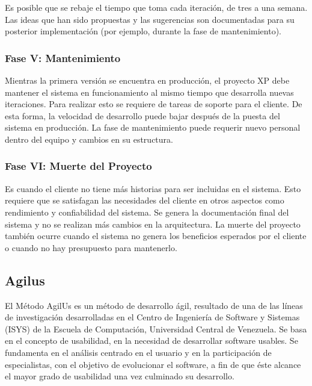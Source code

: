 	Es posible que se rebaje el tiempo que toma cada iteración, de tres a una semana. Las ideas que han sido propuestas y las sugerencias son documentadas para su posterior implementación (por ejemplo, durante la fase de mantenimiento).

\setlength{\parskip}{0mm}

\subsubsection{Fase V: Mantenimiento}
\setlength{\parskip}{5mm}

	Mientras la primera versión se encuentra en producción, el proyecto XP debe mantener el sistema en funcionamiento al mismo tiempo que desarrolla nuevas iteraciones. Para realizar esto se requiere de tareas de soporte para el cliente. De esta forma, la velocidad de desarrollo puede bajar después de la puesta del sistema en producción. La fase de mantenimiento puede requerir nuevo personal dentro del equipo y cambios en su estructura.

\setlength{\parskip}{0mm}

\subsubsection{Fase VI: Muerte del Proyecto}
\setlength{\parskip}{5mm}

	Es cuando el cliente no tiene más historias para ser incluidas en el sistema. Esto requiere que se satisfagan las necesidades del cliente en otros aspectos como rendimiento y confiabilidad del sistema. Se genera la documentación final del sistema y no se realizan más cambios en la arquitectura. La muerte del proyecto también ocurre cuando el sistema no genera los beneficios esperados por el cliente o cuando no hay presupuesto para mantenerlo.

\setlength{\parskip}{0mm}


\pagebreak
\subsection{Agilus}
\setlength{\parskip}{5mm}

	El Método AgilUs es un método de desarrollo ágil, resultado de una de las líneas de investigación desarrolladas en el Centro de Ingeniería de Software y Sistemas (ISYS) de la Escuela de Computación, Universidad Central de Venezuela. Se basa en el concepto de usabilidad, en la necesidad de desarrollar software usables. Se fundamenta en el análisis centrado en el usuario y en la participación de especialistas, con el objetivo de evolucionar el software, a fin de que éste alcance el mayor grado de usabilidad una vez culminado su desarrollo.
	
